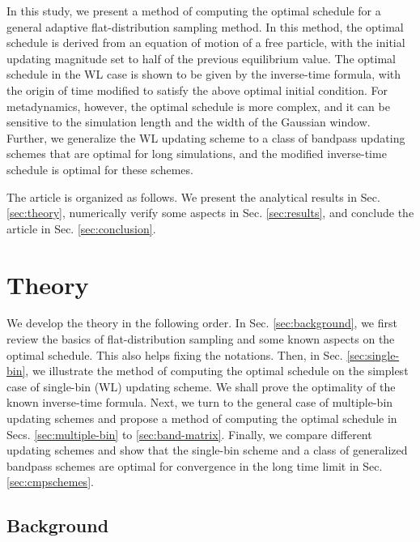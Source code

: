 \documentclass[reprint, floatfix]{revtex4-1}
\begin{document}
In this study,
we present a method of computing
the optimal schedule
for a general adaptive flat-distribution sampling method.
%
In this method, the optimal schedule is derived
from an equation of motion of a free particle,
with the initial updating magnitude set to
half of the previous equilibrium value.
%
The optimal schedule in the WL case
is shown to be given by
the inverse-time formula,
with the origin of time modified
to satisfy the above optimal initial condition.
%
For metadynamics, however,
the optimal schedule is more complex,
and it can be sensitive to the simulation length
and the width of the Gaussian window.
%
Further, we generalize
the WL updating scheme
to a class of bandpass updating schemes
that are optimal for long simulations,
and the modified inverse-time schedule is optimal for these schemes.
%



The article is organized as follows.
%
We present the analytical results in Sec. \ref{sec:theory},
numerically verify some aspects
in Sec. \ref{sec:results},
and conclude the article
in Sec. \ref{sec:conclusion}.




\section{\label{sec:theory}
Theory}



We develop the theory
in the following order.
%
In Sec. \ref{sec:background},
we first review the basics of
flat-distribution sampling
and some known aspects on the optimal schedule.
%
This also helps fixing the notations.
%
Then, in Sec. \ref{sec:single-bin},
we illustrate the method of
computing the optimal schedule
on the simplest case of
single-bin (WL) updating scheme.
%
We shall prove the optimality
of the known inverse-time formula.
%
Next, we turn to the general case
of multiple-bin updating schemes
and propose a method of computing
the optimal schedule
in Secs. \ref{sec:multiple-bin}
to \ref{sec:band-matrix}.
%
Finally, we compare different updating schemes
and show that the single-bin scheme
and a class of generalized bandpass schemes
are optimal for convergence
in the long time limit
in Sec. \ref{sec:cmpschemes}.



\subsection{\label{sec:background}
Background}
\end{document}
